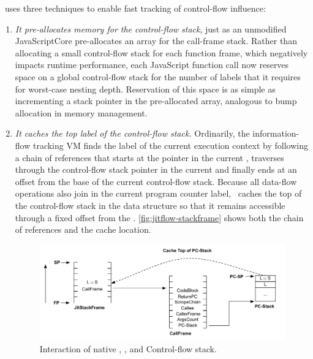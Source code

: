 \JitFlow\ uses three techniques to enable fast tracking of control-flow influence:
\begin{enumerate}

\item \textit{It pre-allocates memory for the control-flow stack}, just as an unmodified JavaScriptCore pre-allocates an array for the call-frame stack.
Rather than allocating a small control-flow stack for each function frame, which negatively impacts runtime performance, each JavaScript function call now reserves space on a global control-flow stack for the number of labels that it requires for worst-case nesting depth.
Reservation of this space is as simple as incrementing a stack pointer in the pre-allocated array, analogous to bump allocation in memory management.

\item \textit{It caches the top label of the control-flow stack.}
Ordinarily, the information-flow tracking VM finds the label of the current execution context by following a chain of references that starts at the  pointer in the current , traverses through the control-flow stack pointer in the current  and finally ends at an offset from the base of the current control-flow stack.
Because all data-flow operations also join in the current program counter label, \JitFlow\ caches the top of the control-flow stack in the  data structure so that it remains accessible through a fixed offset from the .
\autoref{fig:jitflow-stackframe} shows both the chain of references and the cache location.

\begin{figure}[ht]
  \centerline{\includegraphics[width=\linewidth,keepaspectratio=true]{graphics/stackframe.pdf}}
  \caption{Interaction of native , , and Control-flow stack.}
  \label{fig:jitflow-stackframe}
\end{figure}


\end{enumerate}
